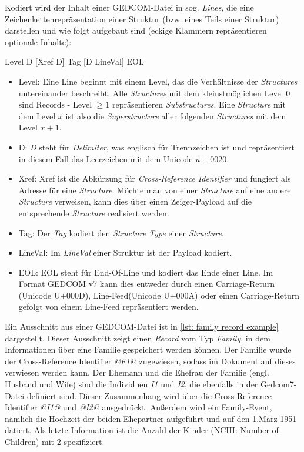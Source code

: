 Kodiert wird der Inhalt einer GEDCOM-Datei in sog. \textit{Lines}, die eine Zeichenkettenrepräsentation einer Struktur (bzw. eines Teils einer Struktur) darstellen und wie folgt aufgebaut sind (eckige Klammern repräsentieren optionale Inhalte):
\begin{center}
	Level  D  [Xref  D]  Tag  [D  LineVal]  EOL
\end{center}
\begin{itemize}
	\item Level: Eine Line beginnt mit einem Level, das die Verhältnisse der \textit{Structures} untereinander beschreibt. Alle \textit{Structures} mit dem kleinstmöglichen Level $0$ sind Records - Level $\ge1$ repräsentieren \textit{Substructures}. Eine \textit{Structure} mit dem Level $x$ ist also die \textit{Superstructure} aller folgenden \textit{Structures} mit dem Level $x+1$.
	\item D: \textit{D} steht für \textit{Delimiter}, was englisch für Trennzeichen ist und repräsentiert in diesem Fall das Leerzeichen mit dem Unicode $u+0020$.
	\item Xref: Xref ist die Abkürzung für \textit{Cross-Reference Identifier} und fungiert als Adresse für eine \textit{Structure}. Möchte man von einer \textit{Structure} auf eine andere \textit{Structure} verweisen, kann dies über einen Zeiger-Payload auf die entsprechende \textit{Structure} realisiert werden.
	\item Tag: Der \textit{Tag} kodiert den \textit{Structure Type} einer \textit{Structure}.
	\item LineVal: Im \textit{LineVal} einer Struktur ist der Payload kodiert.
	\item EOL: EOL steht für End-Of-Line und kodiert das Ende einer Line. Im Format GEDCOM v7 kann dies entweder durch einen Carriage-Return (Unicode U+000D), Line-Feed(Unicode U+000A) oder einen Carriage-Return gefolgt von einem Line-Feed repräsentiert werden.
\end{itemize}
Ein Ausschnitt aus einer GEDCOM-Datei ist in \ref{lst: family record example} dargestellt. Dieser Ausschnitt zeigt einen \textit{Record} vom Typ \textit{Family}, in dem Informationen über eine Familie gespeichert werden können. Der Familie wurde der Cross-Reference Identifier \textit{@F1@} zugewiesen, sodass im Dokument auf dieses verwiesen werden kann. Der Ehemann und die Ehefrau der Familie (engl. Husband und Wife) sind die Individuen \textit{I1} und \textit{I2}, die ebenfalls in der Gedcom7-Datei definiert sind. Dieser Zusammenhang wird über die Cross-Reference Identifier \textit{@I1@} und \textit{@I2@} ausgedrückt. Außerdem wird ein Family-Event, nämlich die Hochzeit der beiden Ehepartner aufgeführt und auf den 1.März 1951 datiert. Als letzte Information ist die Anzahl der Kinder (NCHI: Number of Children) mit 2 spezifiziert.
